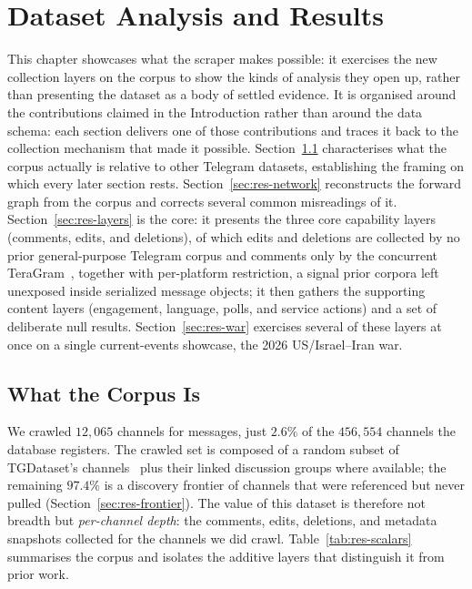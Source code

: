 \chapter{Dataset Analysis and Results}
\label{chap:results}

This chapter showcases what the scraper makes possible: it exercises the new collection layers on the corpus to show the kinds of analysis they open up, rather than presenting the dataset as a body of settled evidence. It is organised around the contributions claimed in the Introduction rather than around the data schema: each section delivers one of those contributions and traces it back to the collection mechanism that made it possible. Section~\ref{sec:res-corpus} characterises what the corpus actually is relative to other Telegram datasets, establishing the framing on which every later section rests. Section~\ref{sec:res-network} reconstructs the forward graph from the corpus and corrects several common misreadings of it. Section~\ref{sec:res-layers} is the core: it presents the three core capability layers (comments, edits, and deletions), of which edits and deletions are collected by no prior general-purpose Telegram corpus and comments only by the concurrent TeraGram~\cite{teragram2026}, together with per-platform restriction, a signal prior corpora left unexposed inside serialized message objects; it then gathers the supporting content layers (engagement, language, polls, and service actions) and a set of deliberate null results. Section~\ref{sec:res-war} exercises several of these layers at once on a single current-events showcase, the 2026 US/Israel--Iran war.

\section{What the Corpus Is}
\label{sec:res-corpus}

We crawled $12{,}065$ channels for messages, just $2.6\%$ of the $456{,}554$ channels the database registers. The crawled set is composed of a random subset of TGDataset's channels~\cite{lamorgia2025} plus their linked discussion groups where available; the remaining $97.4\%$ is a discovery frontier of channels that were referenced but never pulled (Section~\ref{sec:res-frontier}). The value of this dataset is therefore not breadth but \emph{per-channel depth}: the comments, edits, deletions, and metadata snapshots collected for the channels we did crawl. Table~\ref{tab:res-scalars} summarises the corpus and isolates the additive layers that distinguish it from prior work.

